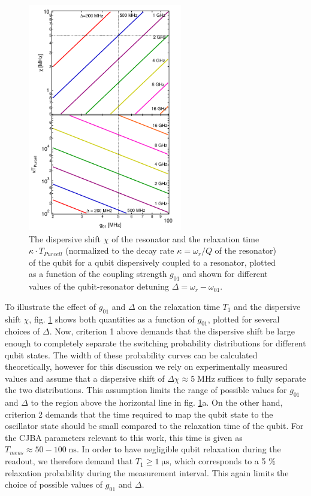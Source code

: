 \begin{figure}
	\includegraphics[width=0.6\textwidth]{./material/mathematica/readout_purcell_and_chi_vs_g}
	\caption[]{The dispersive shift $\chi$ of the resonator and the relaxation time $\kappa\cdot T_{Purcell}$ (normalized to the decay rate $\kappa=\omega_r/Q$ of the resonator) of the qubit for a qubit dispersively coupled to a resonator, plotted as a function of the coupling strength $g_{01}$ and shown for different values of the qubit-resonator detuning $\Delta = \omega_{r}-\omega_{01}$.}
	\label{fig:purcell_rate_and_chi}
\end{figure}


To illustrate the effect of $g_{01}$ and $\Delta$ on the relaxation time $T_1$ and the dispersive shift $\chi$, fig. \ref{fig:purcell_rate_and_chi} shows both quantities as a function of $g_{01}$, plotted for several choices of $\Delta$. Now, criterion 1 above demands that the dispersive shift be large enough to completely separate the switching probability distributions for different qubit states. The width of these probability curves can be calculated theoretically, however for this discussion we rely on experimentally measured values and assume that a dispersive shift of $\Delta \chi \approx 5\;\mathrm{MHz}$ suffices to fully separate the two distributions. This assumption limits the range of possible values for $g_{01}$ and $\Delta$ to the region above the horizontal line in fig. \ref{fig:purcell_rate_and_chi}a. On the other hand, criterion 2 demands that the time required to map the qubit state to the oscillator state should be small compared to the relaxation time of the qubit. For the CJBA parameters relevant to this work, this time is given as $T_{meas}\approx 50-100\;\mathrm{ns}$. In order to have negligible qubit relaxation during the readout, we therefore demand that $T_1 \ge 1\;\mathrm{\mu s}$, which corresponds to a 5 \% relaxation probability during the measurement interval. This again limits the choice of possible values of $g_{01}$ and $\Delta$. 

